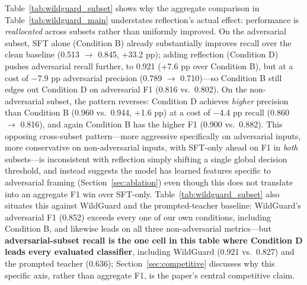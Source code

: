 \documentclass[superintelligence,article,submit,pdftex,moreauthors]{Definitions/mdpi}
\begin{document}
Table~\ref{tab:wildguard_subset} shows why the aggregate comparison in Table~\ref{tab:wildguard_main} understates reflection's actual effect: performance is \emph{reallocated} across subsets rather than uniformly improved. On the adversarial subset, SFT alone (Condition B) already substantially improves recall over the clean baseline (0.513 $\to$ 0.845, +33.2 pp); adding reflection (Condition D) pushes adversarial recall further, to 0.921 (+7.6 pp over Condition B), but at a cost of $-$7.9 pp adversarial precision (0.789 $\to$ 0.710)---so Condition B still edges out Condition D on adversarial F1 (0.816 vs.\ 0.802). On the non-adversarial subset, the pattern reverses: Condition D achieves \emph{higher} precision than Condition B (0.960 vs.\ 0.944, +1.6 pp) at a cost of $-$4.4 pp recall (0.860 $\to$ 0.816), and again Condition B has the higher F1 (0.900 vs.\ 0.882). This opposing cross-subset pattern---more aggressive specifically on adversarial inputs, more conservative on non-adversarial inputs, with SFT-only ahead on F1 in \emph{both} subsets---is inconsistent with reflection simply shifting a single global decision threshold, and instead suggests the model has learned features specific to adversarial framing (Section~\ref{sec:ablation}) even though this does not translate into an aggregate F1 win over SFT-only. Table~\ref{tab:wildguard_subset} also situates this against WildGuard and the prompted-teacher baseline: WildGuard's adversarial F1 (0.852) exceeds every one of our own conditions, including Condition B, and likewise leads on all three non-adversarial metrics---but \textbf{adversarial-subset recall is the one cell in this table where Condition D leads every evaluated classifier}, including WildGuard (0.921 vs.\ 0.827) and the prompted teacher (0.636); Section~\ref{sec:competitive} discusses why this specific axis, rather than aggregate F1, is the paper's central competitive claim.
\end{document}
